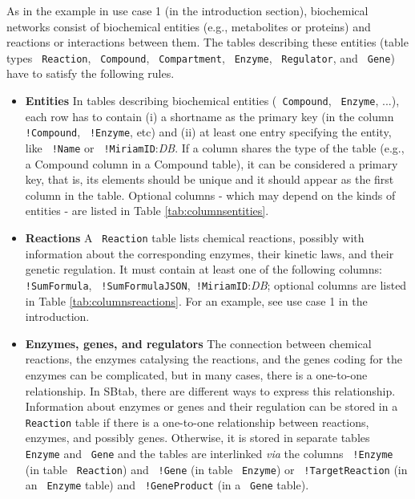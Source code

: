 \documentclass[a4paper]{article}
\newcommand{\tab}[1]{{\texttt{\color{red} #1}}}
\newcommand{\col}[1]{\texttt{\color{blue} #1}}
\begin{document}
As in the example in use case 1 (in the introduction section), biochemical 
networks consist of biochemical entities (e.g., metabolites or proteins) 
and reactions or interactions between them. The tables describing these 
entities (table types \tab{Reaction}, \tab{Compound}, \tab{Compartment}, 
\tab{Enzyme}, \tab{Regulator}, and \tab{Gene}) have to satisfy the following 
rules.

\begin{itemize}

\item \textbf{Entities} In tables describing biochemical entities
  (\tab{Compound}, \tab{Enzyme}, ...), each row has to contain (i) a
  shortname as the primary key (in the column \col{!Compound},
  \col{!Enzyme}, etc) and (ii) at least one entry specifying the
  entity, like \col{!Name} or \col{!MiriamID}:\emph{DB}.  If a column
  shares the type of the table (e.g., a Compound column in a Compound
  table), it can be considered a primary key, that is, its elements
  should be unique and it should appear as the first column in the
  table.  Optional columns - which may depend on the kinds of entities
  - are listed in Table \ref{tab:columnsentities}.

\item \textbf{Reactions}
A \tab{Reaction} table lists chemical reactions, possibly with
information about the corresponding enzymes, their kinetic laws, and
their genetic regulation. It must contain at least one of the
following columns: \col{!SumFormula},  \col{!SumFormulaJSON},\col{!MiriamID}:\emph{DB};  optional
columns are listed in Table \ref{tab:columnsreactions}. For an
example, see use case 1 in the introduction.

\item 
\textbf{Enzymes, genes, and regulators}
The connection between chemical reactions, the enzymes catalysing the
reactions, and the genes coding for the enzymes can be complicated,
but in many cases, there is a one-to-one relationship. In SBtab, there
are different ways to express this relationship.  Information about
enzymes or genes and their regulation can be stored in a
\tab{Reaction} table if there is a one-to-one relationship between
reactions, enzymes, and possibly genes.  Otherwise, it is stored in
separate tables \tab{Enzyme} and \tab{Gene} and the tables are
interlinked \emph{via} the columns
\col{!Enzyme} (in table \tab{Reaction}) and
\col{!Gene} (in table \tab{Enzyme}) or
\col{!TargetReaction} (in an \tab{Enzyme}
table) and \col{!GeneProduct} (in a \tab{Gene}
table). 

\end{itemize}
\end{document}
